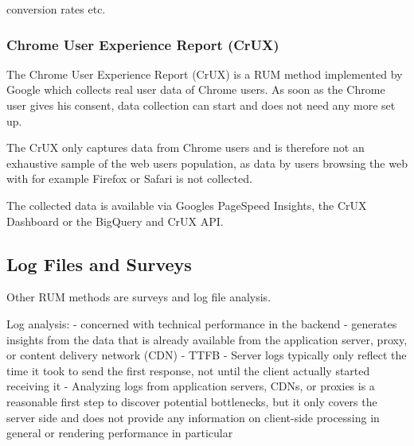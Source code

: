 conversion rates etc.













\subsubsection{Chrome User Experience Report (CrUX)}


The Chrome User Experience Report (CrUX) is a RUM method implemented by Google which collects real user data of Chrome users.
As soon as the Chrome user gives his consent, data collection can start and does not need any more set up.

The CrUX only captures data from Chrome users and is therefore not an exhaustive sample of the web users population, as data by users browsing the web with for example Firefox or Safari is not collected.

The collected data is available via Googles PageSpeed Insights, the CrUX Dashboard or the BigQuery and CrUX API. %








\subsection{Log Files and Surveys}

Other RUM methods are surveys and log file analysis.



Log analysis:
- concerned with technical performance in the backend
- generates insights from the data that is already available from the application server, proxy, or content delivery network (CDN)
- TTFB
- Server logs typically only reflect the time it took to send the first response, not until the client actually started receiving it
- Analyzing logs from application servers, CDNs, or proxies is a reasonable first step to discover potential bottlenecks, but it only covers the server side and does not provide any information on client-side processing in general or rendering performance in particular


